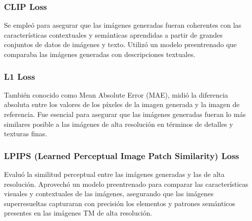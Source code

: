             \subsubsection{CLIP Loss} 
                Se empleó para asegurar que las imágenes generadas fueran coherentes con las características contextuales y semánticas aprendidas a partir de grandes conjuntos de datos de imágenes y texto. Utilizó un modelo preentrenado que comparaba las imágenes generadas con descripciones textuales.
                
            \subsubsection{L1 Loss} 
                También conocido como Mean Absolute Error (MAE), midió la diferencia absoluta entre los valores de los píxeles de la imagen generada y la imagen de referencia. Fue esencial para asegurar que las imágenes generadas fueran lo más similares posible a las imágenes de alta resolución en términos de detalles y texturas finas.
                
            \subsubsection{LPIPS (Learned Perceptual Image Patch Similarity) Loss} 
                Evaluó la similitud perceptual entre las imágenes generadas y las de alta resolución. Aprovechó un modelo preentrenado para comparar las características visuales y contextuales de las imágenes, asegurando que las imágenes superresueltas capturaran con precisión los elementos y patrones semánticos presentes en las imágenes TM de alta resolución.
                